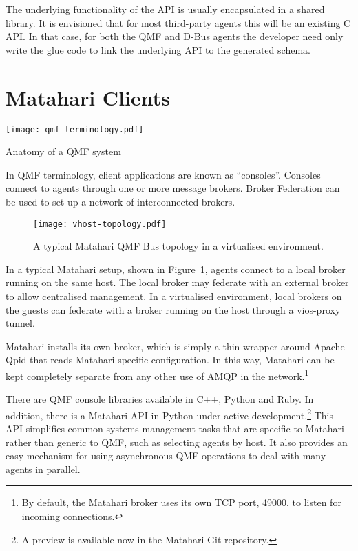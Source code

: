 \documentclass{tufte-handout}
\begin{document}
The underlying functionality of the API is usually encapsulated in a shared library. It is envisioned that for most third-party agents this will be an existing C API. In that case, for both the QMF and D-Bus agents the developer need only write the glue code to link the underlying API to the generated schema.

\section{Matahari Clients}

\begin{marginfigure}
\texttt{[image: qmf-terminology.pdf]}
\caption{Anatomy of a QMF system}
\label{fig:qmf-terminology}
\end{marginfigure}

In QMF terminology, client applications are known as ``consoles''. Consoles connect to agents through one or more message brokers. Broker Federation can be used to set up a network of interconnected brokers.

\begin{figure}[b!]
\texttt{[image: vhost-topology.pdf]}
\caption{A typical Matahari QMF Bus topology in a virtualised environment.}
\label{fig:vhost-topology}
\end{figure}

In a typical Matahari setup, shown in Figure~\ref{fig:vhost-topology}, agents connect to a local broker running on the same host. The local broker may federate with an external broker to allow centralised management. In a virtualised environment, local brokers on the guests can federate with a broker running on the host through a  vios-proxy tunnel.
 
Matahari installs its own broker, which is simply a thin wrapper around Apache Qpid that reads Matahari-specific configuration. In this way, Matahari can be kept completely separate from any other use of AMQP in the network.\footnote{By default, the Matahari broker uses its own TCP port, 49000, to listen for incoming connections.}

There are QMF console libraries available in C++, Python and Ruby.
In addition, there is a Matahari API in Python under active development.\footnote{A preview is available now in the Matahari Git repository.} This API simplifies common systems-management tasks that are specific to Matahari rather than generic to QMF, such as selecting agents by host. It also provides an easy mechanism for using asynchronous QMF operations to deal with many agents in parallel.
\end{document}
